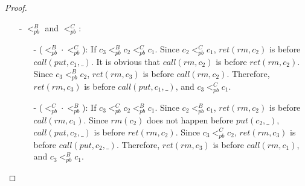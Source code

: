 \begin {proof}
\begin{itemize}
\begin{itemize}
    \item[-] ($<_{\textit{pb}}^C \cdot <_{\textit{pb}}^A$): If $c_3 <_{\textit{pb}}^C c_2 <_{\textit{pb}}^A c_1$. Since $c_2 <_{\textit{pb}}^A c_1$, $\textit{ret}(\textit{put},c_2,\_)$ is before $\textit{call}(\textit{put},c_1,\_)$. It is obvious that $\textit{call}(\textit{put},c_2,\_)$ is before $\textit{ret}(\textit{put},c_2,\_)$. Since $c_3 <_{\textit{pb}}^C c_2$, $\textit{ret}(\textit{rm},c_3)$ is before $\textit{call}(\textit{put},c_2,\_)$. Therefore, $\textit{ret}(\textit{rm},c_3)$ is before $\textit{call}(\textit{put},c_1,\_)$, and $c_3 <_{\textit{pb}}^C c_1$.

    \end{itemize}

\item[-] $<_{\textit{pb}}^B$ and $<_{\textit{pb}}^C$:

    \begin{itemize}
    \setlength{\itemsep}{0.5pt}
    \item[-] ($<_{\textit{pb}}^B \cdot <_{\textit{pb}}^C$): If $c_3 <_{\textit{pb}}^B c_2 <_{\textit{pb}}^C c_1$. Since $c_2 <_{\textit{pb}}^C c_1$, $\textit{ret}(\textit{rm},c_2)$ is before $\textit{call}(\textit{put},c_1,\_)$. It is obvious that $\textit{call}(\textit{rm},c_2)$ is before $\textit{ret}(\textit{rm},c_2)$. Since $c_3 <_{\textit{pb}}^B c_2$, $\textit{ret}(\textit{rm},c_3)$ is before $\textit{call}(\textit{rm},c_2)$. Therefore, $\textit{ret}(\textit{rm},c_3)$ is before $\textit{call}(\textit{put},c_1,\_)$, and $c_3 <_{\textit{pb}}^C c_1$.

    \item[-] ($<_{\textit{pb}}^C \cdot <_{\textit{pb}}^B$): If $c_3 <_{\textit{pb}}^C c_2 <_{\textit{pb}}^B c_1$. Since $c_2 <_{\textit{pb}}^B c_1$, $\textit{ret}(\textit{rm},c_2)$ is before $\textit{call}(\textit{rm},c_1)$. Since $\textit{rm}(c_2)$ does not happen before $\textit{put}(c_2,\_)$, $\textit{call}(\textit{put},c_2,\_)$ is before $\textit{ret}(\textit{rm},c_2)$. Since $c_3 <_{\textit{pb}}^C c_2$, $\textit{ret}(\textit{rm},c_3)$ is before $\textit{call}(\textit{put},c_2,\_)$. Therefore, $\textit{ret}(\textit{rm},c_3)$ is before $\textit{call}(\textit{rm},c_1)$, and $c_3 <_{\textit{pb}}^B c_1$.
    \end{itemize}


\end{itemize}
\end{proof}
